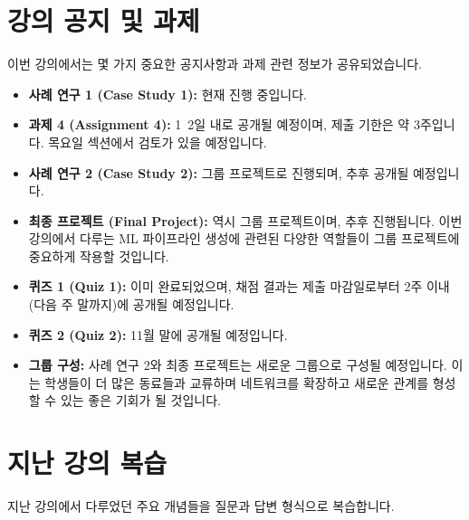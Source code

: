 \documentclass[11pt,a4paper]{article}
\begin{document}
\newpage
\section{강의 공지 및 과제}

이번 강의에서는 몇 가지 중요한 공지사항과 과제 관련 정보가 공유되었습니다.

\begin{itemize}
    \item \textbf{사례 연구 1 (Case Study 1):} 현재 진행 중입니다.
    \item \textbf{과제 4 (Assignment 4):} 1~2일 내로 공개될 예정이며, 제출 기한은 약 3주입니다. 목요일 섹션에서 검토가 있을 예정입니다.
    \item \textbf{사례 연구 2 (Case Study 2):} 그룹 프로젝트로 진행되며, 추후 공개될 예정입니다.
    \item \textbf{최종 프로젝트 (Final Project):} 역시 그룹 프로젝트이며, 추후 진행됩니다. 이번 강의에서 다루는 ML 파이프라인 생성에 관련된 다양한 역할들이 그룹 프로젝트에 중요하게 작용할 것입니다.
    \item \textbf{퀴즈 1 (Quiz 1):} 이미 완료되었으며, 채점 결과는 제출 마감일로부터 2주 이내(다음 주 말까지)에 공개될 예정입니다.
    \item \textbf{퀴즈 2 (Quiz 2):} 11월 말에 공개될 예정입니다.
    \item \textbf{그룹 구성:} 사례 연구 2와 최종 프로젝트는 새로운 그룹으로 구성될 예정입니다. 이는 학생들이 더 많은 동료들과 교류하며 네트워크를 확장하고 새로운 관계를 형성할 수 있는 좋은 기회가 될 것입니다.
\end{itemize}

\newpage
\section{지난 강의 복습}

지난 강의에서 다루었던 주요 개념들을 질문과 답변 형식으로 복습합니다.
\end{document}
